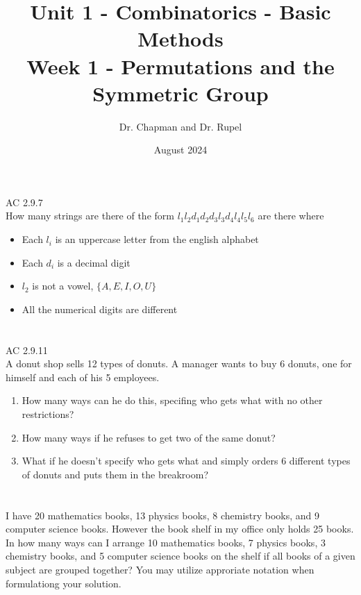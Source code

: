 \documentclass{article}
\title{Unit 1 - Combinatorics - Basic Methods\\ Week 1 - Permutations and the Symmetric Group}
\author{Dr. Chapman and Dr. Rupel}
\date{August 2024}
\begin{document}
\maketitle

\section{}
AC 2.9.7\\
How many strings are there of the form $l_1l_2d_1d_2d_3l_3d_4l_4l_5l_6$ are there where
\begin{itemize}
  \item Each $l_i$ is an uppercase letter from the english alphabet
  \item Each $d_i$ is a decimal digit
  \item $l_2$ is not a vowel, $\{A, E, I, O, U\}$
  \item All the numerical digits are different
\end{itemize}
\section{}
AC 2.9.11\\
A donut shop sells 12 types of donuts. A manager wants to buy 6 donuts, one for himself and each of his 5 employees.
\begin{enumerate}
    \item How many ways can he do this, specifing who gets what with no other restrictions?
    \item How many ways if he refuses to get two of the same donut?
    \item What if he doesn't specify who gets what and simply orders 6 different types of donuts and puts them in the breakroom?
\end{enumerate}
\section{}
I have 20 mathematics books, 13 physics books, 8 chemistry books, and 9 computer science books. However the book shelf in my office only holds 25 books. In how many ways can I arrange 10 mathematics books, 7 physics books, 3 chemistry books, and 5 computer science books on the shelf if all books of a given subject are grouped together? You may utilize approriate notation when formulationg your solution.
\end{document}
